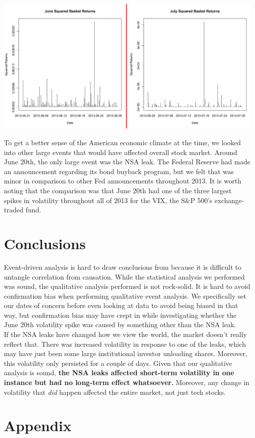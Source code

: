 \documentclass[11pt]{amsart}
\begin{document}
\centerline{\includegraphics[scale=0.7]{june+july_squared_ret.pdf}}

To get a better sense of the American economic climate at the time, we looked into other large events that would have affected overall stock market. Around June 20th, the only large event was the NSA leak. The Federal Reserve had made an announcement regarding its bond buyback program, but we felt that was minor in comparison to other Fed announcements throughout 2013. It is worth noting that the comparison was that June 20th had one of the three largest spikes in volatility throughout all of 2013 for the VIX, the S\&P 500's exchange-traded fund. \\

\section{Conclusions}
Event-driven analysis is hard to draw conclusions from because it is difficult to untangle correlation from causation. While the statistical analysis we performed was sound, the qualitative analysis performed is not rock-solid. It is hard to avoid confirmation bias when performing qualitative event analysis. We specifically set our dates of concern before even looking at data to avoid being biased in that way, but confirmation bias may have crept in while investigating whether the June 20th volatility spike was caused by something other than the NSA leak. \\

If the NSA leaks have changed how we view the world, the market doesn't really reflect that. There was increased volatility in response to one of the leaks, which may have just been some large institutional investor unloading shares. Moreover, this volatility only persisted for a couple of days. Given that our qualitative analysis is sound, \textbf{the NSA leaks affected short-term volatility in one instance but had no long-term effect whatsoever.} Moreover, any change in volatility that \textit{did} happen affected the entire market, not just tech stocks. \\

\newpage
\section{Appendix}
\end{document}
